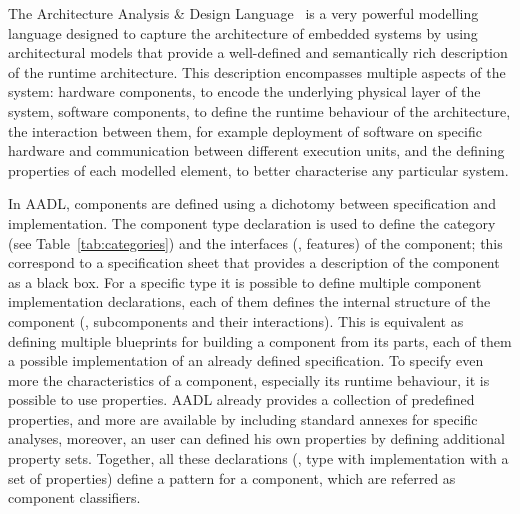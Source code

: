 The Architecture Analysis \& Design Language~\cite{feiler2006architecture} is a very powerful modelling language designed to capture the architecture of embedded systems by using architectural models that provide a well-defined and semantically rich description of the runtime architecture. This description encompasses multiple aspects of the system: hardware components, to encode the underlying physical layer of the system, software components, to define the runtime behaviour of the architecture, the interaction between them, for example deployment of software on specific hardware and communication between different execution units, and the defining properties of each modelled element, to better characterise any particular system.

In AADL, components are defined using a dichotomy between specification and implementation. The component type declaration is used to define the category (see Table~\ref{tab:categories}) and the interfaces (\ie, features) of the component; this correspond to a specification sheet that provides a description of the component as a black box. For a specific type it is possible to define multiple component implementation declarations, each of them defines the internal structure of the component (\ie, subcomponents and their interactions). This is equivalent as defining multiple blueprints for building a component from its parts, each of them a possible implementation of an already defined specification. To specify even more the characteristics of a component, especially its runtime behaviour, it is possible to use properties. AADL already provides a collection of predefined properties, and more are available by including standard annexes for specific analyses, moreover, an user can defined his own properties by defining additional property sets. Together, all these declarations (\ie, type with implementation with a set of properties) define a pattern for a component, which are referred as component classifiers.
 
